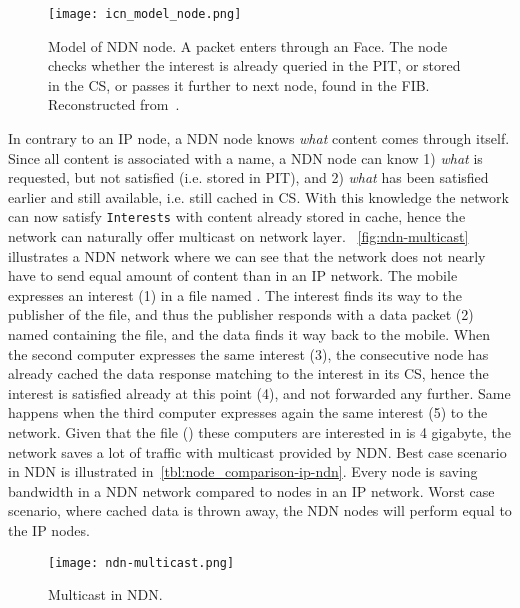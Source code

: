 \begin{figure}[H]
  \centering
  \texttt{[image: icn\_model\_node.png]}
  \caption[Model of NDN node]{Model of NDN node. A packet enters through an Face. 
  The node checks whether the \gls{interest} is already queried in the PIT, or stored in the CS, or passes it further to next node, found in the FIB.
  Reconstructed from~\cite{jac09-03}.}
  \label{fig:icn-model-node}
\end{figure}

In contrary to an \gls{IP} node, a \gls{NDN} node knows \textit{what} content comes through itself. 
Since all content is associated with a \gls{name}, a \gls{NDN} node can know 1) \textit{what} is requested, but not satisfied (i.e. stored in \gls{PIT}), and 2) \textit{what} has been satisfied earlier and still available, i.e. still cached in \gls{CS}.
With this knowledge the network can now satisfy \texttt{Interests} with content already stored in cache, hence the network can naturally offer \gls{multicast} on network layer.
~\autoref{fig:ndn-multicast} illustrates a \gls{NDN} network where we can see that the network does not nearly have to send equal amount of content than in an \gls{IP} network.
The mobile expresses an \gls{interest} (1) in a file named .
The \gls{interest} finds its way to the \gls{publisher} of the file, and thus the \gls{publisher} responds with a \gls{data} packet (2) named  containing the file, and the \gls{data} finds it way back to the mobile.
When the second computer expresses the same \gls{interest} (3), the consecutive node has already cached the \gls{data} response matching to the \gls{interest} in its \gls{CS}, hence the \gls{interest} is satisfied already at this point (4), and not forwarded any further.
Same happens when the third computer expresses again the same \gls{interest} (5) to the network.
Given that the file () these computers are interested in is 4 gigabyte, the network saves a lot of traffic with \gls{multicast} provided by \gls{NDN}.
Best case scenario in \gls{NDN} is illustrated in~\autoref{tbl:node_comparison-ip-ndn}.
Every node is saving bandwidth in a \gls{NDN} network compared to nodes in an \gls{IP} network.
Worst case scenario, where cached \gls{data} is thrown away, the \gls{NDN} nodes will perform equal to the \gls{IP} nodes.

\begin{figure}[H]
  \centering
  \texttt{[image: ndn-multicast.png]}
  \caption[Multicast in NDN]{Multicast in NDN.}
  \label{fig:ndn-multicast}
\end{figure}


